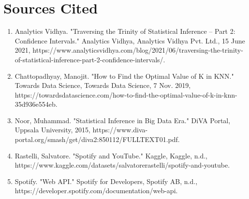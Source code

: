 \documentclass[titlepage]{article}
\begin{document}
\section{Sources Cited}
\begin{enumerate}
    \item
    Analytics Vidhya. "Traversing the Trinity of Statistical Inference – Part 2: Confidence Intervals." Analytics Vidhya, Analytics Vidhya Pvt. Ltd., 15 June 2021, https://www.analyticsvidhya.com/blog/2021/06/traversing-the-trinity-of-statistical-inference-part-2-confidence-intervals/.
    \item
    Chattopadhyay, Manojit. "How to Find the Optimal Value of K in KNN." Towards Data Science, Towards Data Science, 7 Nov. 2019, https://towardsdatascience.com/how-to-find-the-optimal-value-of-k-in-knn-35d936e554eb.
    \item 
    Noor, Muhammad. "Statistical Inference in Big Data Era." DiVA Portal, Uppsala University, 2015, https://www.diva-portal.org/smash/get/diva2:850112/FULLTEXT01.pdf.
    \item 
    Rastelli, Salvatore. "Spotify and YouTube." Kaggle, Kaggle, n.d., https://www.kaggle.com/datasets/salvatorerastelli/spotify-and-youtube.
    \item 
    Spotify. "Web API." Spotify for Developers, Spotify AB, n.d., https://developer.spotify.com/documentation/web-api.
\end{enumerate}
\end{document}
